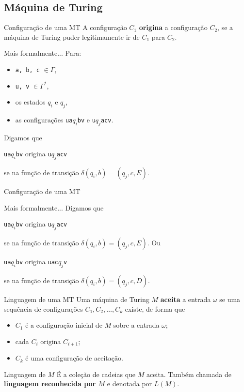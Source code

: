 \documentclass[xcolor=dvipsnames,table]{beamer}
\begin{document}
	\subsection{Máquina de Turing}
	\begin{frame}{Configuração de uma MT}
		A configuração $C_1$ {\bf origina} a configuração $C_2$, se a máquina de Turing puder legitimamente ir de $C_1$ para $C_2$. 
		\begin{block}{Mais formalmente...}					Para:
			\begin{itemize}
				\item {\tt a, b, c} $\in \Gamma$, 
				\item {\tt u, v} $\in \Gamma^*$,  
				\item os estados $q_i$ e $q_j$, 
				\item as configurações {\tt ua}$q_i${\tt bv} e {\tt u}$q_j${\tt acv}. 
				\end{itemize}
			Digamos que 
			\begin{center}
				{\tt ua}$q_i${\tt bv} origina {\tt u}$q_j${\tt acv} 
			\end{center} 
			se na função de transição $\delta(q_i, b) = (q_j, c, E)$.
		\end{block}
	\end{frame}
	
	\begin{frame}{Configuração de uma MT}
		\begin{block}{Mais formalmente...}
			Digamos que 
			\begin{center}
				{\tt ua}$q_i${\tt bv} origina {\tt u}$q_j${\tt acv} 
			\end{center} 
			se na função de transição $\delta(q_i, b) = (q_j, c, E)$. Ou
			\begin{center}
				{\tt ua}$q_i${\tt bv} origina {\tt uac}$q_j${\tt v} 
			\end{center} 
			se na função de transição $\delta(q_i, b) = (q_j, c, D)$.
		\end{block}
	\end{frame}
	
	\begin{frame}{Linguagem de uma MT}
		Uma máquina de Turing $M$ {\bf aceita} a entrada $\omega$ se uma sequência de configurações $C_1, C_2, \ldots, C_k$ existe, de forma que 
		\begin{itemize}
			\item $C_1$ é a configuração inicial de $M$ sobre a entrada $\omega$;
			\item cada $C_i$ origina $C_{i+1}$;
			\item $C_k$ é uma configuração de aceitação.
		\end{itemize} 
		
		\begin{block}{Linguagem de $M$}
			É a coleção de cadeias que $M$ aceita. Também chamada de {\bf linguagem reconhecida por $M$} e denotada por $L(M)$.
		\end{block}		
	\end{frame}
\end{document}
